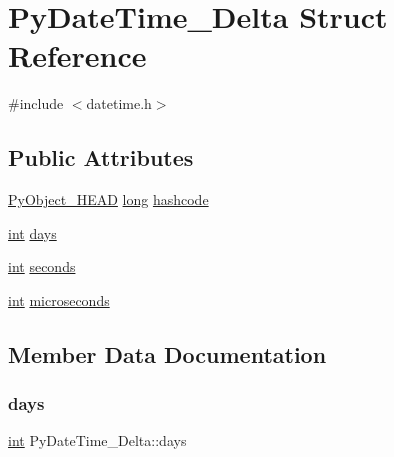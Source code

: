 \hypertarget{struct_py_date_time___delta}{}\section{Py\+Date\+Time\+\_\+\+Delta Struct Reference}
\label{struct_py_date_time___delta}


{\ttfamily \#include $<$datetime.\+h$>$}

\subsection*{Public Attributes}
\begin{DoxyCompactItemize}
\item 
\mbox{\hyperlink{_python27_2object_8h_a0bf35c1f3ea13f925de94d8593db3b7e}{Py\+Object\+\_\+\+H\+E\+AD}} \mbox{\hyperlink{modsupport_8h_a0cb68e00fb9fb1260ee2daadd9fe6611}{long}} \mbox{\hyperlink{struct_py_date_time___delta_a23740dde2f75d5e32b20aefdabd13374}{hashcode}}
\item 
\mbox{\hyperlink{warnings_8h_a74f207b5aa4ba51c3a2ad59b219a423b}{int}} \mbox{\hyperlink{struct_py_date_time___delta_a41436e9bfcd0b005c33f0d57bb4ab3a0}{days}}
\item 
\mbox{\hyperlink{warnings_8h_a74f207b5aa4ba51c3a2ad59b219a423b}{int}} \mbox{\hyperlink{struct_py_date_time___delta_a31d1e1c9eeccdb867ec43536a4b6c721}{seconds}}
\item 
\mbox{\hyperlink{warnings_8h_a74f207b5aa4ba51c3a2ad59b219a423b}{int}} \mbox{\hyperlink{struct_py_date_time___delta_a0c712ea03616f403e388033d768ebcab}{microseconds}}
\end{DoxyCompactItemize}


\subsection{Member Data Documentation}
\mbox{\label{struct_py_date_time___delta_a41436e9bfcd0b005c33f0d57bb4ab3a0}} 
\subsubsection{\texorpdfstring{days}{days}}
{\footnotesize\ttfamily \mbox{\hyperlink{warnings_8h_a74f207b5aa4ba51c3a2ad59b219a423b}{int}} Py\+Date\+Time\+\_\+\+Delta\+::days}

